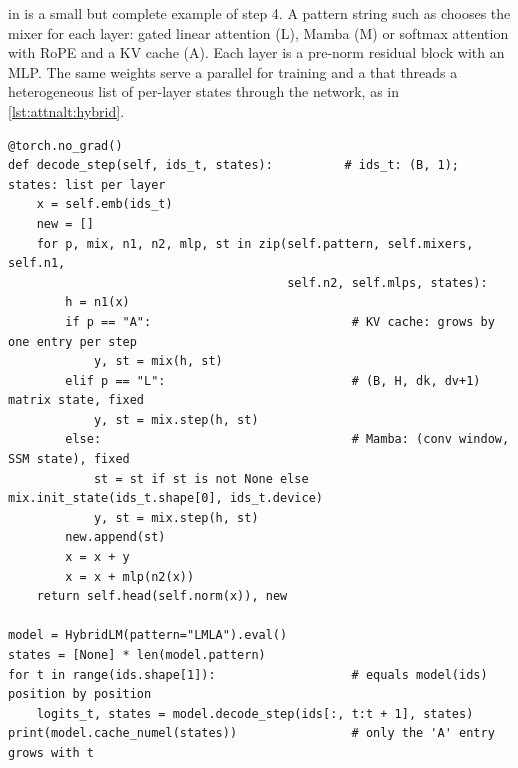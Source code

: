  in  is a small but complete example of step 4. A pattern string
such as  chooses the mixer for each layer: gated linear attention (L), Mamba (M) or softmax
attention with RoPE and a KV cache (A). Each layer is a pre-norm residual block with an MLP. The same
weights serve a parallel  for training and a  that threads a
heterogeneous list of per-layer states through the network, as in \cref{lst:attnalt:hybrid}.

\begin{lstlisting}[caption={Decoding a hybrid model: one state object per layer, of a type that depends on the layer.},label={lst:attnalt:hybrid}]
@torch.no_grad()
def decode_step(self, ids_t, states):          # ids_t: (B, 1); states: list per layer
    x = self.emb(ids_t)
    new = []
    for p, mix, n1, n2, mlp, st in zip(self.pattern, self.mixers, self.n1,
                                       self.n2, self.mlps, states):
        h = n1(x)
        if p == "A":                            # KV cache: grows by one entry per step
            y, st = mix(h, st)
        elif p == "L":                          # (B, H, dk, dv+1) matrix state, fixed
            y, st = mix.step(h, st)
        else:                                   # Mamba: (conv window, SSM state), fixed
            st = st if st is not None else mix.init_state(ids_t.shape[0], ids_t.device)
            y, st = mix.step(h, st)
        new.append(st)
        x = x + y
        x = x + mlp(n2(x))
    return self.head(self.norm(x)), new

model = HybridLM(pattern="LMLA").eval()
states = [None] * len(model.pattern)
for t in range(ids.shape[1]):                   # equals model(ids) position by position
    logits_t, states = model.decode_step(ids[:, t:t + 1], states)
print(model.cache_numel(states))                # only the 'A' entry grows with t
\end{lstlisting}

